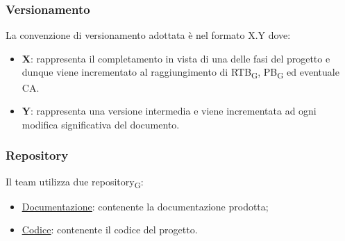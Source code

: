 \subsubsection{Versionamento}
La convenzione di versionamento adottata è nel formato X.Y dove:
\begin{itemize}
    \item \textbf{X}: rappresenta il completamento in vista di una delle fasi del progetto e dunque viene incrementato al raggiungimento di
    {RTB\textsubscript{G}}, {PB\textsubscript{G}} ed eventuale CA.
    \item \textbf{Y}: rappresenta una versione intermedia e viene incrementata ad ogni modifica significativa del documento.
\end{itemize}

\subsubsection{Repository}
Il team utilizza due {repository\textsubscript{G}}:
\begin{itemize}
    \item \href{https://github.com/7Last/docs.git}{\underline{Documentazione}}: contenente la documentazione prodotta;
    \item \href{https://github.com/7Last/7Last.github.io.git}{\underline{Codice}}: contenente il codice del progetto.
\end{itemize}

